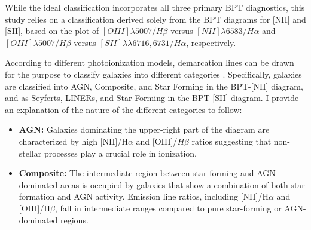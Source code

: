 While the ideal classification incorporates all three primary BPT diagnostics, this study relies on a classification derived solely from the BPT diagrams for [NII] and [SII], based on the plot of $[OIII]\lambda 5007/H\beta$ versus  $[NII]\lambda 6583/H\alpha$ and $[OIII]\lambda 5007/H\beta$ versus $[SII]\lambda\lambda 6716,6731 / H\alpha$, respectively.

According to different photoionization models, demarcation lines can be drawn for the purpose to classify galaxies into different categories \cite{2006MNRAS.372..961K}. Specifically, galaxies are classified into AGN, Composite, and Star Forming in the BPT-[NII] diagram, and as Seyferts, LINERs, and Star Forming in the BPT-[SII] diagram. I provide an explanation of the nature of the different categories to follow:



		\begin{itemize}
    		 \item \textbf{AGN:} Galaxies dominating the upper-right part of the diagram are characterized by high [NII]/H$\alpha$ and [OIII]/$H\beta$ ratios suggesting that non-stellar processes play a crucial role in ionization.
		  \item \textbf{Composite:} The intermediate region between star-forming and AGN-dominated areas is occupied by galaxies that show a combination of both star formation and AGN activity. Emission line ratios, including [NII]/H$\alpha$ and [OIII]/H$\beta$, fall in intermediate ranges compared to pure star-forming or AGN-dominated regions.

		\end{itemize}

